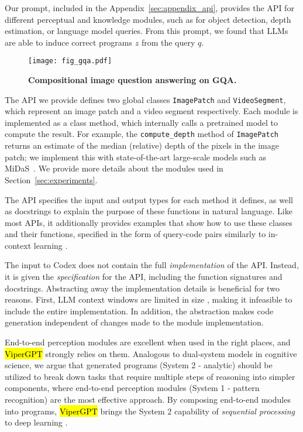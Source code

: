 \documentclass[10pt,twocolumn,letterpaper]{article}
\newcommand{\viper}[0]{{\small\fontfamily{txtt}\selectfont \textcolor{mygreen}{\hl{ViperGPT}}}\xspace}
\begin{document}
Our prompt, included in the Appendix~\ref{sec:appendix_api}, provides the API for different perceptual and knowledge modules, such as for object detection, depth estimation, or language model queries. From this prompt, we found that LLMs are able to induce correct programs $z$ from the query $q$.

\begin{figure*}[t]
    \texttt{[image: fig\_gqa.pdf]}
    \caption{\textbf{Compositional image question answering on GQA.}}
    \label{fig:gqa}
\end{figure*}


The API we provide defines two global classes \texttt{ImagePatch} and \texttt{VideoSegment}, which represent an image patch and a video segment respectively. Each module is implemented as a class method, which internally calls a pretrained model to compute the result. For example, the \texttt{compute\_depth} method of \texttt{ImagePatch} returns an estimate of the median (relative) depth of the pixels in the image patch; we implement this with state-of-the-art large-scale models such as MiDaS~\cite{Ranftl2022}. We provide more details about the modules used in Section~\ref{sec:experiments}. 


The API specifies the input and output types for each method it defines, as well as docstrings to explain the purpose of these functions in natural language. Like most APIs, it additionally provides examples that show how to use these classes and their functions, specified in the form of query-code pairs similarly to in-context learning \cite{suris2020learning,brown_language_2020}. 

The input to Codex does not contain the full \textit{implementation} of the API. Instead, it is given the \textit{specification} for the API, including the function signatures and docstrings. Abstracting away the implementation details is beneficial for two reasons. First, LLM context windows are limited in size \cite{brown_language_2020}, making it infeasible to include the entire implementation. In addition, the abstraction makes code generation independent of changes made to the module implementation.

End-to-end perception modules are excellent when used in the right places, and \viper strongly relies on them. Analogous to dual-system models \cite{kahneman2011thinking} in cognitive science, we argue that generated programs (System 2 - analytic) should be utilized to break down tasks that require multiple steps of reasoning into simpler components, where end-to-end perception modules (System 1 - pattern recognition) are the most effective approach. By composing end-to-end modules into programs, \viper brings the System 2 capability of \textit{sequential processing} to deep learning \cite{bengio_consciousness_2019}.
\end{document}

